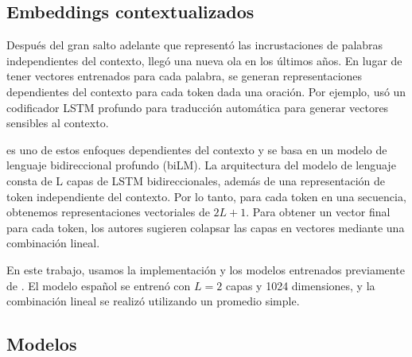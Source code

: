 

\subsection{Embeddings contextualizados}
\label{subsec:elmo}

Después del gran salto adelante que representó las incrustaciones de palabras independientes del contexto, llegó una nueva ola en los últimos años. En lugar de tener vectores entrenados para cada palabra, se generan representaciones dependientes del contexto para cada token dada una oración. Por ejemplo, \citet{mccann2017learned} usó un codificador LSTM profundo para traducción automática para generar vectores sensibles al contexto.

\elmo{} \cite{peters2018} es uno de estos enfoques dependientes del contexto y se basa en un modelo de lenguaje bidireccional profundo (biLM). La arquitectura del modelo de lenguaje consta de L capas de LSTM bidireccionales, además de una representación de token independiente del contexto. Por lo tanto, para cada token en una secuencia, obtenemos representaciones vectoriales de $ 2L + 1 $.
Para obtener un vector final para cada token, los autores sugieren colapsar las capas en vectores mediante una combinación lineal.

%

En este trabajo, usamos la implementación y los modelos entrenados previamente de \cite{che-EtAl:2018:K18-2}. El modelo español se entrenó con $L = 2 $ capas y 1024 dimensiones, y la combinación lineal se realizó utilizando un promedio simple.

\subsection{Modelos}

